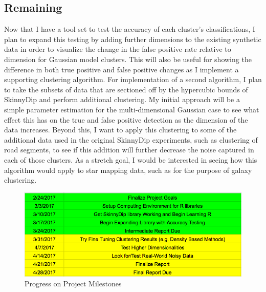 \documentclass{sig-alternate-05-2015}
\begin{document}
\subsection{Remaining}
Now that I have a tool set to test the accuracy of each cluster's classifications, I plan to expand this testing by adding further dimensions to the existing synthetic data in order to visualize the change in the false positive rate relative to dimension for Gaussian model clusters. This will also be useful for showing the difference in both true positive and false positive changes as I implement a supporting clustering algorithm.
For implementation of a second algorithm, I plan to take the subsets of data that are sectioned off by the hypercubic bounds of SkinnyDip and perform additional clustering. My initial approach will be a simple parameter estimation for the multi-dimensional Gaussian case to see what effect this has on the true and false positive detection as the dimension of the data increases.
Beyond this, I want to apply this clustering to some of the additional data used in the original SkinnyDip experiments, such as clustering of road segments, to see if this addition will further decrease the noise captured in each of those clusters. As a stretch goal, I would be interested in seeing how this algorithm would apply to star mapping data, such as for the purpose of galaxy clustering.

\begin{figure}[t]
\centering
\includegraphics[width=\textwidth]{images/newtimeline}
\caption{Progress on Project Milestones}
\label{fig:newmilestones}
\end{figure}





\end{document}
